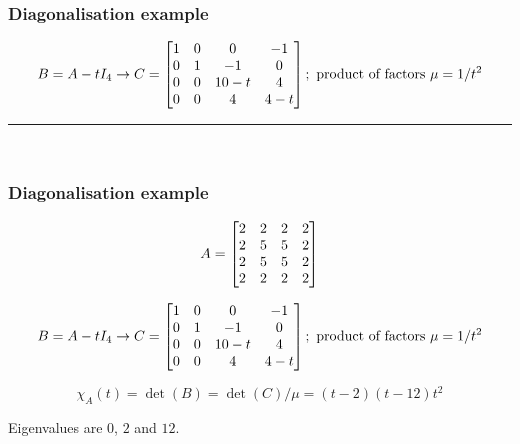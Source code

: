 \documentclass[9pt]{beamer}
\begin{document}
\begin{frame}[t]
 \frametitle{Diagonalisation example}
 \[ B=A-tI_4 \to C = 
    \left[\begin{matrix} 1   & 0   & 0    & -1 \\
         0   & 1   & -1   & 0 \\
         0   & 0   & 10-t & 4 \\
         0   & 0   & 4    & 4-t \end{matrix}\right]; 
    \text{ product of factors } \mu=1/t^2
 \]

 \medskip

 \hrule
 
 \medskip

  \\
\end{frame}



\begin{frame}[t]
 \frametitle{Diagonalisation example}
 \[ A = \left[\begin{matrix} 2&2&2&2 \\ 2&5&5&2 \\ 2&5&5&2 \\ 2&2&2&2 \end{matrix}\right] \]

 \bigskip

 \[ B=A-tI_4 \to C = 
    \left[\begin{matrix} 1   & 0   & 0    & -1 \\
         0   & 1   & -1   & 0 \\
         0   & 0   & 10-t & 4 \\
         0   & 0   & 4    & 4-t \end{matrix}\right]; 
    \text{ product of factors } \mu=1/t^2
 \]

 \bigskip

 \[ \chi_A(t) = \det(B) = \det(C)/\mu=(t-2)(t-12)t^2 \]

 \bigskip

 Eigenvalues are $0$, $2$ and $12$.
\end{frame}
 
\end{document}
